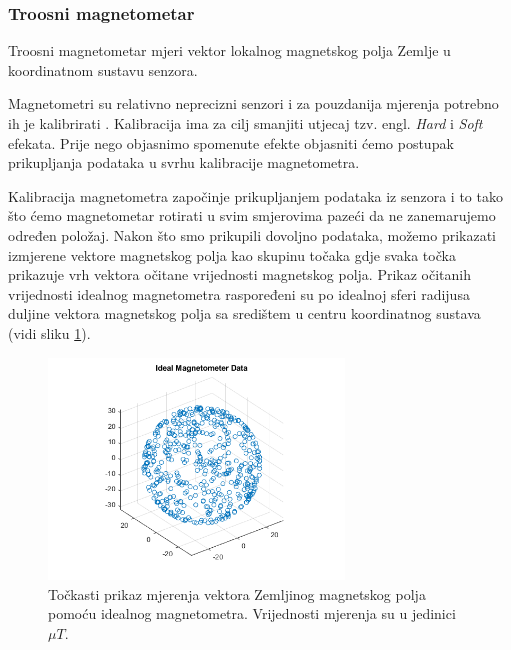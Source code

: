 \documentclass[times, utf8, diplomski, numeric]{templates/template}
\begin{document}
{{{            \subsubsection{Troosni magnetometar}{
            \label{subsubsection:troosni_magnetometar}
                Troosni magnetometar mjeri vektor lokalnog magnetskog polja Zemlje u koordinatnom sustavu senzora. 
                
                Magnetometri su relativno neprecizni senzori i za pouzdanija mjerenja potrebno ih je kalibrirati \cite{adcsKnjiga}. Kalibracija ima za cilj smanjiti utjecaj tzv. engl. \emph{Hard} i \emph{Soft} efekata. Prije nego objasnimo spomenute efekte objasniti ćemo postupak prikupljanja podataka u svrhu kalibracije magnetometra. 

                Kalibracija magnetometra započinje prikupljanjem podataka iz senzora i to tako što ćemo magnetometar rotirati u svim smjerovima pazeći da ne zanemarujemo određen položaj. Nakon što smo prikupili dovoljno podataka, možemo prikazati izmjerene vektore magnetskog polja kao skupinu točaka gdje svaka točka prikazuje vrh vektora očitane vrijednosti magnetskog polja. Prikaz očitanih vrijednosti idealnog magnetometra raspoređeni su po idealnoj sferi radijusa duljine vektora magnetskog polja sa središtem u centru koordinatnog sustava (vidi sliku \ref{fig:mag_ideal}).

                \begin{figure}[htb]
                \centering
                \includegraphics[width=0.7\textwidth]{images/mag_ideal.png}
                \caption{Točkasti prikaz mjerenja vektora Zemljinog magnetskog polja pomoću idealnog magnetometra. Vrijednosti mjerenja su u jedinici $\mu T$.}
                \label{fig:mag_ideal}
                \end{figure}

}}}}
\end{document}
